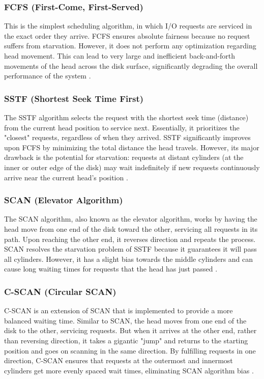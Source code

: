 \documentclass[12pt]{article}
\begin{document}
\subsubsection{FCFS (First-Come, First-Served)}
This is the simplest scheduling algorithm, in which I/O requests are serviced in the exact order they arrive. FCFS ensures absolute fairness because no request suffers from starvation. However, it does not perform any optimization regarding head movement. This can lead to very large and inefficient back-and-forth movements of the head across the disk surface, significantly degrading the overall performance of the system \parencite{GeeksForGeeks2025IO}.

\subsubsection{SSTF (Shortest Seek Time First)}
The SSTF algorithm selects the request with the shortest seek time (distance) from the current head position to service next. Essentially, it prioritizes the "closest" requests, regardless of when they arrived. SSTF significantly improves upon FCFS by minimizing the total distance the head travels. However, its major drawback is the potential for starvation: requests at distant cylinders (at the inner or outer edge of the disk) may wait indefinitely if new requests continuously arrive near the current head's position \parencite{GeeksForGeeks2025IO} \parencite{KansalDiskScheduling}.

\subsubsection{SCAN (Elevator Algorithm)}
The SCAN algorithm, also known as the elevator algorithm, works by having the head move from one end of the disk toward the other, servicing all requests in its path. Upon reaching the other end, it reverses direction and repeats the process. SCAN resolves the starvation problem of SSTF because it guarantees it will pass all cylinders. However, it has a slight bias towards the middle cylinders and can cause long waiting times for requests that the head has just passed \parencite{GeeksForGeeks2025IO}.

\subsubsection{C-SCAN (Circular SCAN)}
C-SCAN is an extension of SCAN that is implemented to provide a more balanced waiting time. Similar to SCAN, the head moves from one end of the disk to the other, servicing requests. But when it arrives at the other end, rather than reversing direction, it takes a gigantic "jump" and returns to the starting position and goes on scanning in the same direction. By fulfilling requests in one direction, C-SCAN ensures that requests at the outermost and innermost cylinders get more evenly spaced wait times, eliminating SCAN algorithm bias \parencite{KansalDiskScheduling, GeeksForGeeks2025IO}.
\end{document}
